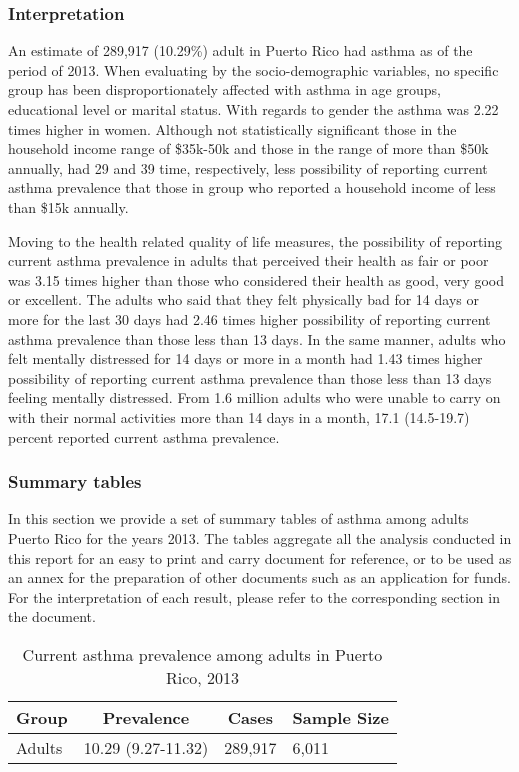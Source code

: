  \subsubsection{Interpretation}

An estimate of 289,917 
(10.29\%) adult in Puerto Rico had asthma as of the period of 2013.
When evaluating by the socio-demographic variables, no specific group has been disproportionately affected with asthma in age groups, educational level or marital status. With regards to gender the asthma was 2.22 times higher in women. Although not statistically significant those in the household income range of \$35k-50k and those in the range of more than \$50k annually, had 29 and 39 time, respectively, less possibility of reporting current asthma prevalence that those in group who reported a household income of less than \$15k annually.

Moving to the health related quality of life measures, the possibility of reporting current asthma prevalence in adults that perceived their health as fair or poor was 3.15 times higher than those who considered their health as good, very good or excellent. The adults who said that they felt physically bad for 14 days or more for the last 30 days had 2.46 times higher possibility of reporting current asthma prevalence than those less than 13 days. In the same manner, adults who felt mentally distressed for 14 days or more in a month had 1.43 times higher possibility of reporting current asthma prevalence than those less than 13 days feeling mentally distressed. From 1.6 million adults who were unable to carry on with their normal activities more than 14 days in a month, 17.1 (14.5-19.7) percent reported current asthma prevalence. 

\newpage
\subsubsection{Summary tables}
In this section we provide a set of summary tables of asthma among adults Puerto Rico for the years 2013. The tables aggregate all the analysis conducted in this report for an easy to print and carry document for reference, or to be used as an annex for the preparation of other documents such as an application for funds. For the interpretation of each result, please refer to the corresponding section in the document.

\begin{table}[H]
\caption{Current asthma prevalence among adults in Puerto Rico, 2013\label{tab:Overall.tabl.Asthma.2013.B}} 
\begin{center}
\begin{tabular}{llll}
\hline\hline
\multicolumn{1}{l}{Group}&\multicolumn{1}{c}{Prevalence}&\multicolumn{1}{c}{Cases}&\multicolumn{1}{c}{Sample Size}\tabularnewline
\hline
Adults&10.29 (9.27-11.32)&289,917&6,011\tabularnewline
\hline
\end{tabular}\end{center}

\end{table}
 
